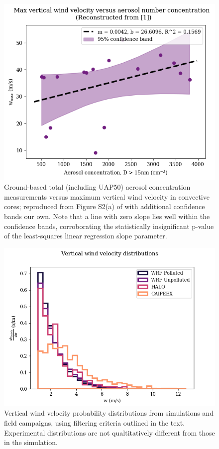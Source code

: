 \documentclass{article}
\begin{document}
\begin{figure}[ht]
    \centering
    \includegraphics[width=12cm]{revhalo/v2_FINAL_fan_fig_s2a.png}
    \caption{Ground-based total (including UAP50) aerosol concentration measurements versus maximum vertical wind velocity in convective cores; reproduced from Figure S2(a) of \cite{Fan2018} with additional confidence bands our own. Note that a line with zero slope lies well within the confidence bands, corroborating the statistically insignificant p-value of the least-squares linear regression slope parameter.}
    \label{fans2a}
\end{figure}

\begin{figure}[ht]
    \centering
    \includegraphics[width=12cm]{revmywrf/v3_FINAL_combined_w_hist_figure.png}
    \caption{Vertical wind velocity probability distributions from simulations and field campaigns, using filtering criteria outlined in the text. Experimental distributions are not qualtitatively different from those in the simulation.}
    \label{combinedwhist}
\end{figure}
\end{document}
